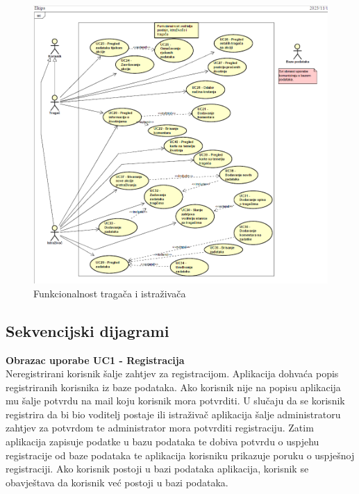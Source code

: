 					\begin{figure}[H]
						\includegraphics[scale=0.8]{slike/dijagram ekipa.png} %
						\centering
						\caption{Funkcionalnost tragača i istraživača}
						\label{fig:Funkcionalnost neregistriranog korisnika, administratora aplikacije i voditelja postaje}
					\end{figure}
				
					\eject		
				
			\subsection{Sekvencijski dijagrami}
				
				\noindent 
				\textbf{Obrazac uporabe UC1 - Registracija}\\

				\noindent 
				Neregistrirani korisnik šalje zahtjev za registracijom. Aplikacija dohvaća popis registriranih korisnika
        				iz baze podataka.
        				Ako korisnik nije na popisu aplikacija mu šalje potvrdu na mail koju korisnik mora potvrditi.
        				U slučaju da se korisnik registrira da bi bio voditelj postaje ili istraživač aplikacija šalje administratoru
        				zahtjev za potvrdom te administrator mora potvrditi registraciju.
        				Zatim aplikacija zapisuje podatke u bazu podataka te dobiva potvrdu o uspjehu registracije od baze podataka
        				te aplikacija korisniku prikazuje poruku o uspješnoj registraciji.
        				Ako korisnik postoji u bazi podataka aplikacija, korisnik se obavještava da korisnik već postoji u bazi podataka.

